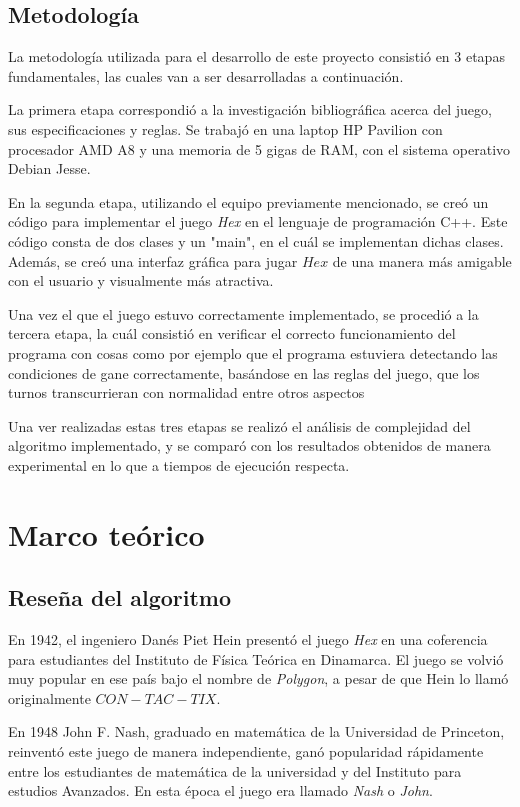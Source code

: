 \documentclass[12pt,letterpaper]{article}
\begin{document}
\subsection{Metodología}
La metodología utilizada para el desarrollo de este proyecto consistió en 3 etapas fundamentales, las cuales van a ser desarrolladas a continuación.

La primera etapa correspondió a la investigación bibliográfica acerca del juego, sus especificaciones y reglas. Se trabajó en una laptop HP Pavilion con procesador AMD A8 y una memoria de 5 gigas de RAM, con el sistema operativo Debian Jesse. 

En la segunda etapa, utilizando el equipo previamente mencionado, se creó un código para implementar el juego \textit{Hex} en el lenguaje de programación C++. Este código consta de dos clases y un "main", en el cuál se implementan dichas clases. Además, se creó una interfaz gráfica para jugar $Hex$ de una manera más amigable con el usuario y visualmente más atractiva.

Una vez el que el juego estuvo correctamente implementado, se procedió a la tercera etapa, la cuál consistió en verificar el correcto funcionamiento del programa con cosas como por ejemplo que el programa estuviera detectando las condiciones de gane correctamente, basándose en las reglas del juego, que los turnos transcurrieran con normalidad entre otros aspectos

Una ver realizadas estas tres etapas se realizó el análisis de complejidad del algoritmo implementado, y se comparó con los resultados obtenidos de manera experimental en lo que a tiempos de ejecución respecta.

\section{Marco teórico}
\subsection{Reseña del algoritmo}
En 1942, el ingeniero Danés Piet Hein presentó el juego \textit{Hex} en una coferencia para estudiantes del Instituto de Física Teórica en Dinamarca. El juego se volvió muy popular en ese país bajo el nombre de \textit{Polygon}, a pesar de que Hein lo llamó originalmente $CON-TAC-TIX$.

En 1948 John F. Nash, graduado en matemática de la Universidad de Princeton, reinventó este juego de manera independiente, ganó popularidad rápidamente entre los estudiantes de matemática de la universidad y del Instituto para estudios Avanzados. En esta época el juego era llamado \textit{Nash} o \textit{John}.
\end{document}
